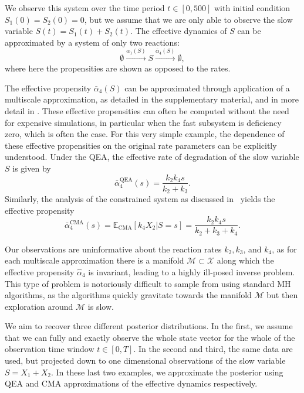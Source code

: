 \documentclass[final]{siamltex}
\newcommand{\edit}[1]{{\color{red} #1}}
\begin{document}
We observe this system over the time period $t \in [0,500]$ with
initial condition $S_1(0) = S_2(0) = 0$, but we assume that we are only able to observe
the slow variable $S(t) = S_1(t) + S_2(t)$. 
The effective dynamics of $S$ can be approximated by a system of only
two reactions:
\begin{equation}\label{eqn:QSSA_system}
	\emptyset \xrightarrow{\alpha_1(S)} S \xrightarrow{\bar{\alpha}_4(S)} \emptyset,
\end{equation}
where here the propensities are shown as opposed to the rates.

The effective propensity $\bar{\alpha}_4(S)$ can be  approximated through
application of a multiscale approximation, as detailed in \edit{the
  supplementary material}, and in more detail in \cite{cotter2016constrained}. These effective
propensities can often be computed without the need for expensive
simulations, in particular when the fast subsystem is deficiency zero,
which is often the case\cite{anderson2010product,anderson2016product}. For this very
simple example, the dependence of these effective
propensities on the original rate parameters can be explicitly
understood. Under the QEA,
the effective rate of degradation of the slow variable $S$ is given by
\begin{equation}
	\bar{\alpha}_4^{\text{QEA}}(s) = \frac{k_2k_4s}{k_2+k_3}.
\end{equation}
Similarly, the analysis of the constrained system as discussed in~\cite{cotter2016constrained} yields the effective propensity
\begin{equation}\label{eqn:chem_CMA_rate}
	\bar{\alpha}_4^{\text{CMA}}(s) = \mathbb{E}_{\text{CMA}}\left[k_4X_2|S=s\right] = \frac{k_2k_4s}{k_2+k_3+k_4}.
\end{equation}

Our observations are uninformative about the reaction rates $k_2,
k_3$, and $k_4$, as for each multiscale approximation there
is a manifold $\mathcal{M} \subset \mathcal{X}$ along which the effective propensity
$\hat{\alpha}_4$ is invariant, leading to a highly ill-posed inverse
problem. This type of problem is notoriously difficult to
sample from using standard MH algorithms, as the algorithms quickly
gravitate towards the manifold $\mathcal{M}$ but then
exploration around $\mathcal{M}$ is slow.

We aim to recover three different posterior distributions. In the
first, we assume that we can fully and exactly observe the whole state
vector for the whole of the observation time window $t \in [0,T]$. In
the second and
third, the same data are used, but projected down to one dimensional observations of the slow
variable $S = X_1 + X_2$. In these last two examples, we approximate the
posterior using QEA and CMA approximations of the
effective dynamics respectively.
\end{document}
